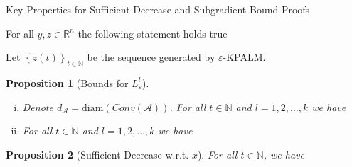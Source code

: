 \documentclass[9pt]{beamer}
\newtheorem{proposition}{Proposition}
\newcommand{\diam}{\mathrm{diam}} %
\begin{document}
	\begin{frame}{Key Properties for Sufficient Decrease and Subgradient Bound Proofs}
		\begin{lemma} 
			For all $y,z \in \mathbb{R}^n$ the following statement holds true
		\end{lemma}
		\pause
		Let $\left\lbrace z(t) \right\rbrace_{t \in \mathbb{N}}$ be the sequence generated by $\varepsilon$-KPALM.
		\begin{proposition}[Bounds for $L^l_{\varepsilon}$] \label{L_bounds_prop}
			\begin{enumerate}[(i)]
				\item Denote $d_{\mathcal{A}} = \diam(Conv(\mathcal{A}))$. For all $t \in \mathbb{N}$ and $l=1,2, \ldots, k$ we have
				\item For all $t \in \mathbb{N}$ and $l=1,2, \ldots, k$ we have
			\end{enumerate}
		\end{proposition}
		\pause
		\begin{proposition}[Sufficient Decrease w.r.t. $x$] \label{H_eps_SD_in_x_prop}
			For all $t \in \mathbb{N}$, we have\\
		\end{proposition}

	\end{frame}
	
\end{document}
